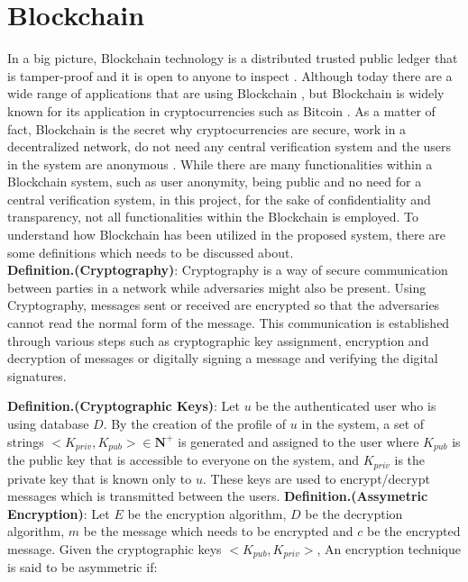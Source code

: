 \section{Blockchain}
In a big picture, Blockchain technology is a distributed trusted public ledger that is tamper-proof and it is open to anyone to inspect \cite{OECD2016Science}. Although today there are a wide range of applications that are using Blockchain \cite{dhillon2017blockchain}, but ‌Blockchain is widely known for its application in cryptocurrencies such as Bitcoin \cite{nakamoto2008bitcoin}. As a matter of fact, Blockchain is the secret why cryptocurrencies are secure, work in a decentralized network, do not need any central verification system and the users in the system are anonymous \cite{halaburda2016beyond}.
While there are many functionalities within a Blockchain system, such as user anonymity, being public and no need for a central verification system, in this project, for the sake of confidentiality and transparency, not all functionalities within the Blockchain is employed. To understand how Blockchain has been utilized in the proposed system, there are some definitions which needs to be discussed about.\\
\textbf{Definition.(Cryptography)}:
Cryptography is a way of secure communication between parties in a network while adversaries might also be present. Using Cryptography, messages sent or received are encrypted so that the adversaries cannot read the normal form of the message. This communication is established through various steps such as cryptographic key assignment, encryption and decryption of messages or digitally signing a message and verifying the digital signatures.

\textbf{Definition.(Cryptographic Keys)}: Let $u$ be the authenticated user who is using database $D$. By the creation of the profile of $u$ in the system, a set of strings $<K_{priv},K_{pub}> \in \mathbf{N}^+$ is generated and assigned to the user where $K_{pub}$ is the public key that is accessible to everyone on the system, and $K_{priv}$ is the private key that is known only to $u$. These keys are used to encrypt/decrypt messages which is transmitted between the users.
\textbf{Definition.(Assymetric Encryption)}: Let $E$ be the encryption algorithm, $D$ be the decryption algorithm, $m$ be the message which needs to be encrypted and $c$ be the encrypted message. Given the cryptographic keys $<K_{pub}, K_{priv}>$, An encryption technique is said to be asymmetric if:

